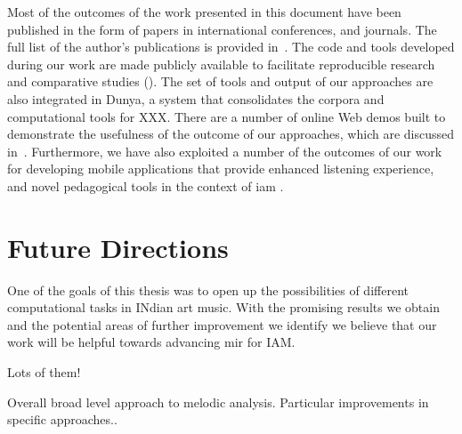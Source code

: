 Most of the outcomes of the work presented in this document have been published in the form of papers in international conferences, and journals. The full list of the author’s publications is provided in~. The code and tools developed during our work are made publicly available to facilitate reproducible research and comparative studies (). The set of tools and output of our approaches are also integrated in Dunya, a system that consolidates the corpora and computational tools for XXX. There are a number of online Web demos built to demonstrate the usefulness of the outcome of our approaches, which are discussed in~\secref{}. Furthermore, we have also exploited a number of the outcomes of our work for developing mobile applications that provide enhanced listening experience, and novel pedagogical tools in the context of \gls{iam} \secref{}.


\section{Future Directions}
\label{sec:future_directions}

One of the goals of this thesis was to open up the possibilities of different computational tasks in INdian art music. With the promising results we obtain and the potential areas of further improvement we identify we believe that our work will be helpful towards advancing mir for IAM. 


Lots of them!

Overall broad level approach to melodic analysis.
Particular improvements in specific approaches..




%
%
%
%
%
%
%
%
%
%
%
